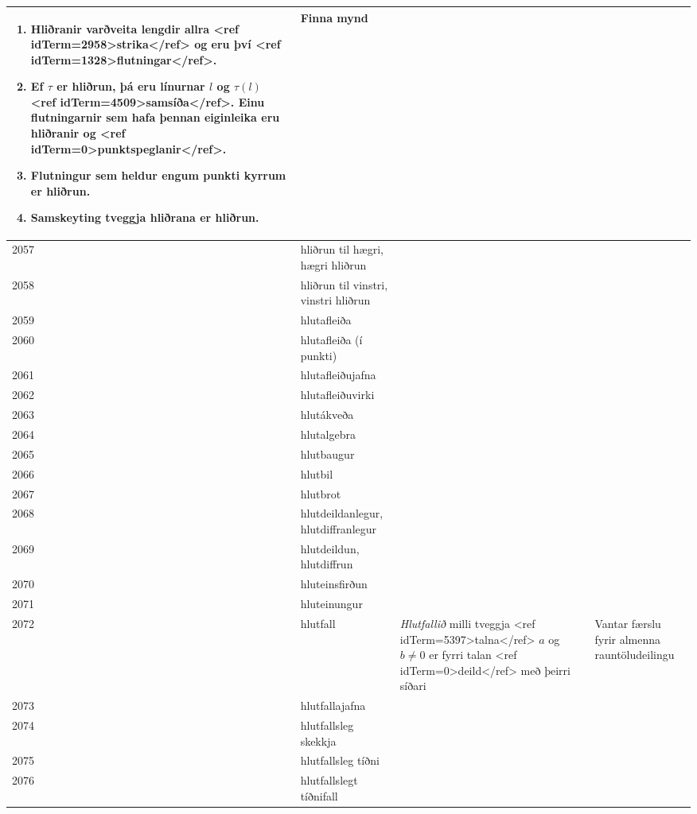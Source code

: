 \begin{longtable}{p{}|p{}|p{}|p{}|p{}}
\begin{enumerate}
    \item Hliðranir varðveita lengdir allra <ref idTerm=2958>strika</ref> og eru því <ref idTerm=1328>flutningar</ref>.
    \item Ef $\tau$ er hliðrun, þá eru línurnar $l$ og $\tau(l)$ <ref idTerm=4509>samsíða</ref>. Einu flutningarnir sem hafa þennan eiginleika eru hliðranir og <ref idTerm=0>punktspeglanir</ref>.
    \item Flutningur sem heldur engum punkti kyrrum er hliðrun.
    \item Samskeyting tveggja hliðrana er hliðrun.
\end{enumerate} & Finna mynd \\
\hline
2057 & hliðrun til hægri, hægri hliðrun &  &  &  \\
\hline
2058 & hliðrun til vinstri, vinstri hliðrun &  &  &  \\
\hline
2059 & hlutafleiða &  &  &  \\
\hline
2060 & hlutafleiða (í punkti) &  &  &  \\
\hline
2061 & hlutafleiðujafna &  &  &  \\
\hline
2062 & hlutafleiðuvirki &  &  &  \\
\hline
2063 & hlutákveða &  &  &  \\
\hline
2064 & hlutalgebra &  &  &  \\
\hline
2065 & hlutbaugur &  &  &  \\
\hline
2066 & hlutbil &  &  &  \\
\hline
2067 & hlutbrot &  &  &  \\
\hline
2068 & hlutdeildanlegur, hlutdiffranlegur &  &  &  \\
\hline
2069 & hlutdeildun, hlutdiffrun &  &  &  \\
\hline
2070 & hluteinsfirðun &  &  &  \\
\hline
2071 & hluteinungur &  &  &  \\
\hline
2072 & hlutfall & \textit{Hlutfallið} milli tveggja <ref idTerm=5397>talna</ref> $a$ og $b \neq 0$ er fyrri talan <ref idTerm=0>deild</ref> með þeirri síðari &  & Vantar færslu fyrir almenna rauntöludeilingu \\
\hline
2073 & hlutfallajafna &  &  &  \\
\hline
2074 & hlutfallsleg skekkja &  &  &  \\
\hline
2075 & hlutfallsleg tíðni &  &  &  \\
\hline
2076 & hlutfallslegt tíðnifall &  &  &  \\

\end{longtable}
